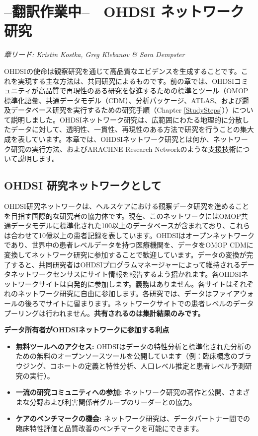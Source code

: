 \documentclass[
  11pt]{book}
\makeatletter
\providecommand{\tightlist}{%
  \setlength{\itemsep}{0pt}\setlength{\parskip}{0pt}}
\newenvironment{kframe}{%
\medskip{}
\setlength{\fboxsep}{.8em}
 \def\at@end@of@kframe{}%
 \ifinner\ifhmode%
  \def\at@end@of@kframe{\end{minipage}}%
  \begin{minipage}{\columnwidth}%
 \fi\fi%
 \def\FrameCommand##1{\hskip\@totalleftmargin \hskip-\fboxsep
 \colorbox{myShadeColor}{##1}\hskip-\fboxsep
     \hskip-\linewidth \hskip-\@totalleftmargin \hskip\columnwidth}%
 \MakeFramed {\advance\hsize-\width
   \@totalleftmargin\z@ \linewidth\hsize
   \@setminipage}}%
 {\par\unskip\endMakeFramed%
 \at@end@of@kframe}
\newenvironment{rmdblock}[1]
  {
  \begin{itemize}
  \renewcommand{\labelitemi}{
    \raisebox{-.7\height}[0pt][0pt]{
      {\setkeys{Gin}{width=3em,keepaspectratio}\texttt{[image: images/\#1]}}
    }
  }
  \setlength{\fboxsep}{1em}
  \begin{kframe}
  \item
  }
  {
  \end{kframe}
  \end{itemize}
  }
\newenvironment{rmdimportant}
  {\begin{rmdblock}{important}}
  {\end{rmdblock}}
\theoremstyle{definition}
\theoremstyle{definition}
\theoremstyle{definition}
\theoremstyle{definition}
\theoremstyle{remark}
\makeatother
\begin{document}
\chapter{--翻訳作業中--　OHDSI ネットワーク研究}\label{NetworkResearch}

\emph{章リード: Kristin Kostka, Greg Klebanov \& Sara Dempster}

OHDSIの使命は観察研究を通じて高品質なエビデンスを生成することです。これを実現する主な方法は、共同研究によるものです。前の章では、OHDSIコミュニティが高品質で再現性のある研究を促進するための標準とツール（OMOP標準化語彙、共通データモデル（CDM）、分析パッケージ、ATLAS、および遡及データベース研究を実行するための研究手順（Chapter \ref{StudySteps}））について説明しました。OHDSIネットワーク研究は、広範囲にわたる地理的に分散したデータに対して、透明性、一貫性、再現性のある方法で研究を行うことの集大成を表しています。本章では、OHDSIネットワーク研究とは何か、ネットワーク研究の実行方法、およびARACHNE Research Networkのような支援技術について説明します。

\section{OHDSI 研究ネットワークとして}\label{ohdsi-ux7814ux7a76ux30cdux30c3ux30c8ux30efux30fcux30afux3068ux3057ux3066}


OHDSI研究ネットワークは、ヘルスケアにおける観察データ研究を進めることを目指す国際的な研究者の協力体です。現在、このネットワークにはOMOP共通データモデルに標準化された100以上のデータベースが含まれており、これらは合わせて10億以上の患者記録を表しています。OHDSIはオープンネットワークであり、世界中の患者レベルデータを持つ医療機関を、データをOMOP CDMに変換してネットワーク研究に参加することで歓迎しています。データの変換が完了すると、共同研究者はOHDSIプログラムマネージャーによって維持されるデータネットワークセンサスにサイト情報を報告するよう招かれます。各OHDSIネットワークサイトは自発的に参加します。義務はありません。各サイトはそれぞれのネットワーク研究に自由に参加します。各研究では、データはファイアウォールの後ろでサイトに留まります。ネットワークサイトでの患者レベルのデータプーリングは行われません。\textbf{共有されるのは集計結果のみです。}

\begin{rmdimportant}
\textbf{データ所有者がOHDSIネットワークに参加する利点}

\begin{itemize}
\tightlist
\item
  \textbf{無料ツールへのアクセス:} OHDSIはデータの特性分析と標準化された分析のための無料のオープンソースツールを公開しています（例：臨床概念のブラウジング、コホートの定義と特性分析、人口レベル推定と患者レベル予測研究の実行）。
\item
  \textbf{一流の研究コミュニティへの参加:} ネットワーク研究の著作と公開、さまざまな分野および利害関係者グループのリーダーとの協力。
\item
  \textbf{ケアのベンチマークの機会:} ネットワーク研究は、データパートナー間での臨床特性評価と品質改善のベンチマークを可能にできます。
\end{itemize}
\end{rmdimportant}
\end{document}
